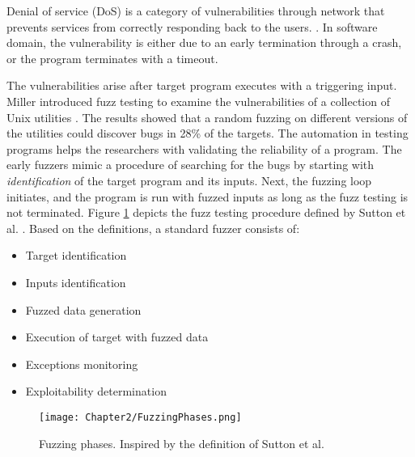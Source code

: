 Denial of service (DoS) is a category of vulnerabilities through network that prevents services from correctly responding back to the users.  \cite{dos}. In software domain, the vulnerability is either due to an early termination through a crash, or the program terminates with a timeout.

The vulnerabilities arise after target program executes with a triggering input. Miller introduced fuzz testing to examine the vulnerabilities of a collection of Unix utilities \cite{miller1990empirical}. The results showed that a random fuzzing on different versions of the utilities could discover bugs in 28\% of the targets. The automation in testing programs helps the researchers with validating the reliability of a program. The early fuzzers mimic a procedure of searching for the bugs by starting with \textit{identification} of the target program and its inputs. Next, the fuzzing loop initiates, and the program is run with fuzzed inputs as long as the fuzz testing is not terminated. Figure \ref{fig:fuzz_phases} depicts the fuzz testing procedure defined by Sutton et al. \cite{sutton2007fuzzing}. Based on the definitions, a standard fuzzer consists of:

\begin{itemize}
    \item Target identification
    \item Inputs identification
    \item Fuzzed data generation
    \item Execution of target with fuzzed data
    \item Exceptions monitoring
    \item Exploitability determination
\end{itemize}

\begin{figure}[!b]
  \texttt{[image: Chapter2/FuzzingPhases.png]}
  \centering
  \caption{Fuzzing phases. Inspired by the definition of Sutton et al. \cite{sutton2007fuzzing}}
  \label{fig:fuzz_phases}
\end{figure}

